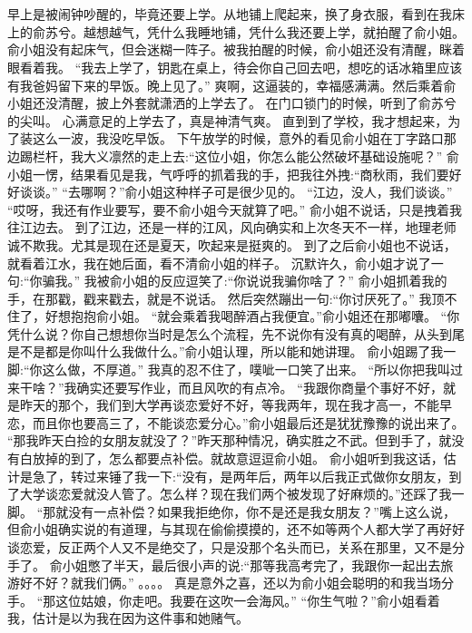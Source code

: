 \chapter{}
早上是被闹钟吵醒的，毕竟还要上学。从地铺上爬起来，换了身衣服，看到在我床上的俞苏兮。越想越气，凭什么我睡地铺，凭什么我还要上学，就拍醒了俞小姐。
俞小姐没有起床气，但会迷糊一阵子。被我拍醒的时候，俞小姐还没有清醒，眯着眼看着我。
“我去上学了，钥匙在桌上，待会你自己回去吧，想吃的话冰箱里应该有我爸妈留下来的早饭。晚上见了。”
爽啊，这逼装的，幸福感满满。然后乘着俞小姐还没清醒，披上外套就潇洒的上学去了。
在门口锁门的时候，听到了俞苏兮的尖叫。
心满意足的上学去了，真是神清气爽。
直到到了学校，我才想起来，为了装这么一波，我没吃早饭。
下午放学的时候，意外的看见俞小姐在丁字路口那边踢栏杆，我大义凛然的走上去:“这位小姐，你怎么能公然破坏基础设施呢？”
俞小姐一愣，结果看见是我，气呼呼的抓着我的手，把我往外拽:“商秋雨，我们要好好谈谈。”
“去哪啊？”俞小姐这种样子可是很少见的。
“江边，没人，我们谈谈。”
“哎呀，我还有作业要写，要不俞小姐今天就算了吧。”
俞小姐不说话，只是拽着我往江边去。 到了江边，还是一样的江风，风向确实和上次冬天不一样，地理老师诚不欺我。尤其是现在还是夏天，吹起来是挺爽的。
到了之后俞小姐也不说话，就看着江水，我在她后面，看不清俞小姐的样子。
沉默许久，俞小姐才说了一句:“你骗我。”
我被俞小姐的反应逗笑了:“你说说我骗你啥了？”
俞小姐抓着我的手，在那戳，戳来戳去，就是不说话。 然后突然蹦出一句:“你讨厌死了。”
我顶不住了，好想抱抱俞小姐。
“就会乘着我喝醉酒占我便宜。”俞小姐还在那嘟囔。
“你凭什么说？你自己想想你当时是怎么个流程，先不说你有没有真的喝醉，从头到尾是不是都是你叫什么我做什么。”俞小姐认理，所以能和她讲理。
俞小姐踢了我一脚:“你这么做，不厚道。”
我真的忍不住了，噗呲一口笑了出来。
“所以你把我叫过来干啥？”我确实还要写作业，而且风吹的有点冷。
“我跟你商量个事好不好，就是昨天的那个，我们到大学再谈恋爱好不好，等我两年，现在我才高一，不能早恋，而且你也要高三了，不能谈恋爱分心。”俞小姐最后还是犹犹豫豫的说出来了。
“那我昨天白捡的女朋友就没了？”昨天那种情况，确实胜之不武。但到手了，就没有白放掉的到了，怎么都要点补偿。就故意逗逗俞小姐。
俞小姐听到我这话，估计是急了，转过来锤了我一下:“没有，是两年后，两年以后我正式做你女朋友，到了大学谈恋爱就没人管了。怎么样？现在我们两个被发现了好麻烦的。”还踩了我一脚。
“那就没有一点补偿？如果我拒绝你，你不是还是我女朋友？”嘴上这么说，但俞小姐确实说的有道理，与其现在偷偷摸摸的，还不如等两个人都大学了再好好谈恋爱，反正两个人又不是绝交了，只是没那个名头而已，关系在那里，又不是分手了。
俞小姐憋了半天，最后很小声的说:“那等我高考完了，我跟你一起出去旅游好不好？就我们俩。”
。。。。
真是意外之喜，还以为俞小姐会聪明的和我当场分手。
“那这位姑娘，你走吧。我要在这吹一会海风。”
“你生气啦？”俞小姐看着我，估计是以为我在因为这件事和她赌气。
